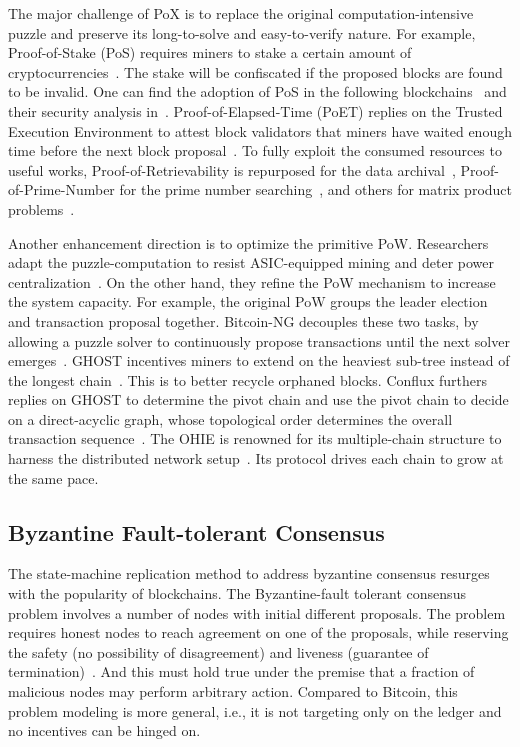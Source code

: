 The major challenge of PoX is to replace the original computation-intensive puzzle and preserve its long-to-solve and easy-to-verify nature. 
For example, Proof-of-Stake (PoS) requires miners to stake a certain amount of cryptocurrencies~\cite{king2012ppcoin}. 
The stake will be confiscated if the proposed blocks are found to be invalid. 
One can find the adoption of PoS in the following blockchains~\cite{kiayias2017ouroboros,david2018ouroboros,bentov2016snow} and their security analysis in~\cite{nguyen2019proof,li2017securing,brown2019formal}. 
Proof-of-Elapsed-Time (PoET) replies on the Trusted Execution Environment to attest block validators that miners have waited enough time before the next block proposal~\cite{chen2017security}. 
To fully exploit the consumed resources to useful works, 
Proof-of-Retrievability is repurposed for the data archival~\cite{miller2014permacoin}, Proof-of-Prime-Number for the prime number searching~\cite{king2013primecoin}, and others for matrix product problems~\cite{shoker2017sustainable}. 

Another enhancement direction is to optimize the primitive PoW. 
Researchers adapt the puzzle-computation to resist ASIC-equipped mining and deter power centralization~\cite{zamanov2018asic,cho2018asic}. 
On the other hand, they refine the PoW mechanism to increase the system capacity.
For example, the original PoW groups the leader election and transaction proposal together. 
Bitcoin-NG decouples these two tasks, by allowing a puzzle solver to continuously propose transactions until the next solver emerges~\cite{eyal2016bitcoin}. 
GHOST incentives miners to extend on the heaviest sub-tree instead of the longest chain~\cite{sompolinsky2015secure}. 
This is to better recycle orphaned blocks. 
Conflux furthers replies on GHOST to determine the pivot chain and use the pivot chain to decide on a direct-acyclic graph, whose topological order determines the overall transaction sequence~\cite{li2018scaling}. 
The OHIE is renowned for its multiple-chain structure to harness the distributed network setup~\cite{yu2020ohie}. 
Its protocol drives each chain to grow at the same pace. 

\subsection{Byzantine Fault-tolerant Consensus}
The state-machine replication method to address byzantine consensus resurges with the popularity of blockchains. 
The Byzantine-fault tolerant consensus problem involves a number of nodes with initial different proposals. 
The problem requires honest nodes to reach agreement on one of the proposals, while reserving the safety (no possibility of disagreement) and liveness (guarantee of termination)~\cite{lamport2019byzantine}. 
And this must hold true under the premise that a fraction of malicious nodes may perform arbitrary action. 
Compared to Bitcoin, this problem modeling is more general, i.e., it is not targeting only on the ledger and no incentives can be hinged on. 

